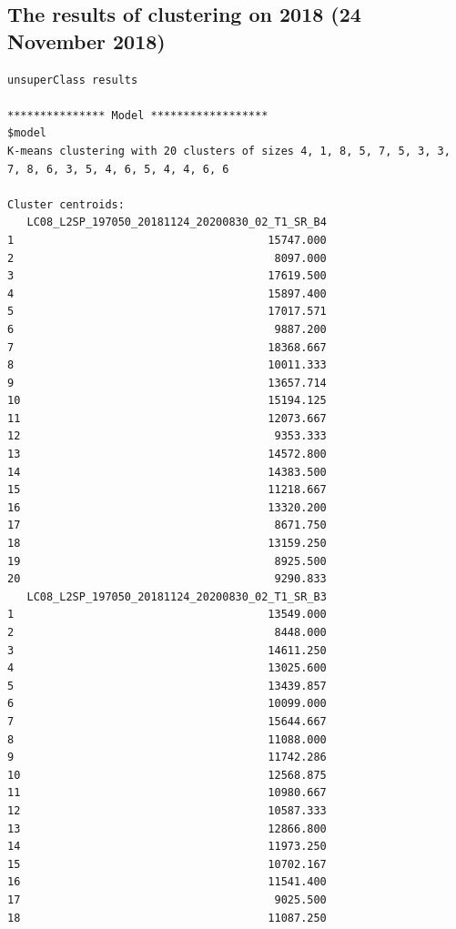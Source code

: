 \documentclass[remotesensing,article,submit,pdftex,moreauthors]{Definitions/mdpi}
\begin{document}
\subsection[\appendixname~\thesubsection]{The results of clustering on 2018 (24 November 2018)}
\begin{scriptsize}
\begin{verbatim}
unsuperClass results

*************** Model ******************
$model
K-means clustering with 20 clusters of sizes 4, 1, 8, 5, 7, 5, 3, 3, 7, 8, 6, 3, 5, 4, 6, 5, 4, 4, 6, 6

Cluster centroids:
   LC08_L2SP_197050_20181124_20200830_02_T1_SR_B4
1                                       15747.000
2                                        8097.000
3                                       17619.500
4                                       15897.400
5                                       17017.571
6                                        9887.200
7                                       18368.667
8                                       10011.333
9                                       13657.714
10                                      15194.125
11                                      12073.667
12                                       9353.333
13                                      14572.800
14                                      14383.500
15                                      11218.667
16                                      13320.200
17                                       8671.750
18                                      13159.250
19                                       8925.500
20                                       9290.833
   LC08_L2SP_197050_20181124_20200830_02_T1_SR_B3
1                                       13549.000
2                                        8448.000
3                                       14611.250
4                                       13025.600
5                                       13439.857
6                                       10099.000
7                                       15644.667
8                                       11088.000
9                                       11742.286
10                                      12568.875
11                                      10980.667
12                                      10587.333
13                                      12866.800
14                                      11973.250
15                                      10702.167
16                                      11541.400
17                                       9025.500
18                                      11087.250

\end{verbatim}
\end{scriptsize}
\end{document}
